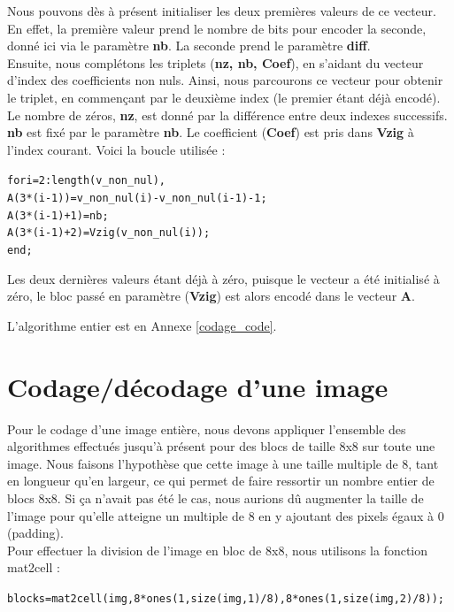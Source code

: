 \documentclass[a4paper, 12pt]{article}
\begin{document}
Nous pouvons dès à présent initialiser les deux premières valeurs de ce vecteur. En effet, la première valeur prend le nombre de bits pour encoder la seconde, donné ici via le paramètre \textbf{nb}. La seconde prend le paramètre \textbf{diff}. \\

Ensuite, nous complétons les triplets (\textbf{nz, nb, Coef}), en s'aidant du vecteur d'index des coefficients non nuls.
Ainsi, nous parcourons ce vecteur pour obtenir le triplet, en commençant par le deuxième index (le premier étant déjà encodé). Le nombre de zéros, \textbf{nz}, est donné par la différence entre deux indexes successifs. \textbf{nb} est fixé par le paramètre \textbf{nb}. Le coefficient (\textbf{Coef}) est pris dans \textbf{Vzig} à l'index courant. Voici la boucle utilisée :

\begin{alltt}
for i=2:length(v_non_nul),
    A(3*(i-1)) = v_non_nul(i) - v_non_nul(i-1) - 1;
    A(3*(i-1)+1) = nb;
    A(3*(i-1)+2) = Vzig(v_non_nul(i));
end;
\end{alltt}

Les deux dernières valeurs étant déjà à zéro, puisque le vecteur a été initialisé à zéro, le bloc passé en paramètre (\textbf{Vzig}) est alors encodé dans le vecteur \textbf{A}.

L'algorithme entier est en Annexe \ref{codage_code}.

\section{Codage/décodage d'une image}
Pour le codage d'une image entière, nous devons appliquer l'ensemble des algorithmes effectués jusqu'à présent pour des blocs de taille 8x8 sur toute une image. Nous faisons l'hypothèse que cette image à une taille multiple de 8, tant en longueur qu'en largeur, ce qui permet de faire ressortir un nombre entier de blocs 8x8. Si ça n'avait pas été le cas, nous aurions dû augmenter la taille de l'image pour qu'elle atteigne un multiple de 8 en y ajoutant des pixels égaux à 0 (padding).\\
Pour effectuer la division de l'image en bloc de 8x8, nous utilisons la fonction mat2cell : 
\begin{alltt}
blocks = mat2cell(img,8*ones(1,size(img,1)/8),8*ones(1,size(img,2)/8));
\end{alltt}
\end{document}
